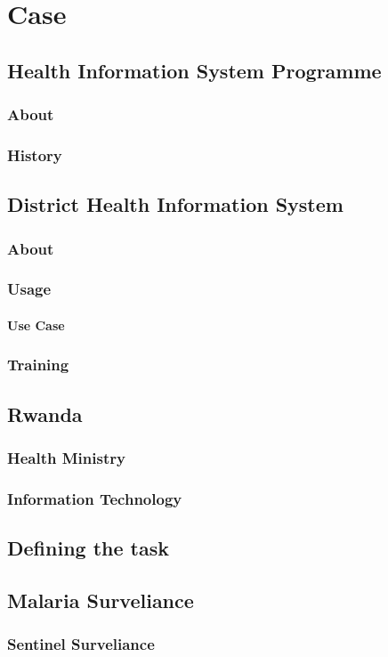 \part{Case}
\chapter{Health Information System Programme}
\section{About}
\section{History}
\chapter{District Health Information System}
\section{About}
\section{Usage}
\subsection{Use Case}
\section{Training}
\chapter{Rwanda}
\section{Health Ministry}
\section{Information Technology}
\chapter{Defining the task}
\chapter{Malaria Surveliance}
\section{Sentinel Surveliance}
